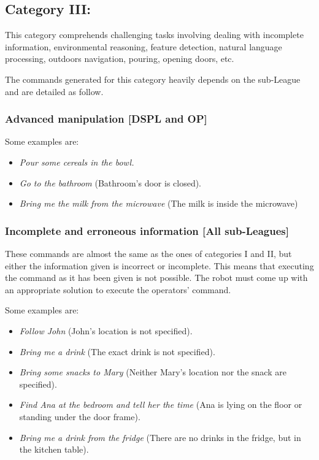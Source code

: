 \subsection{Category III:}
This category comprehends challenging tasks involving dealing with incomplete information, environmental reasoning, feature detection, natural language processing, outdoors navigation, pouring, opening doors, etc.

The commands generated for this category heavily depends on the sub-League and are detailed as follow.

\subsubsection{Advanced manipulation [DSPL and OP]}
Some examples are:
\begin{itemize}
	\item \textit{Pour some cereals in the bowl.}
	\item \textit{Go to the bathroom} (Bathroom's door is closed).
	\item \textit{Bring me the milk from the microwave} (The milk is inside the microwave)
\end{itemize}

\subsubsection{Incomplete and erroneous information [All sub-Leagues]}
These commands are almost the same as the ones of categories I and II, but either the information given is incorrect or incomplete. This means that executing the command as it has been given is not possible. The robot must come up with an appropriate solution to execute the operators' command.

Some examples are:
\begin{itemize}
	\item \textit{Follow John} (John's location is not specified).
	\item \textit{Bring me a drink} (The exact drink is not specified).
	\item \textit{Bring some snacks to Mary} (Neither Mary's location nor the snack are specified).
	\item \textit{Find Ana at the bedroom and tell her the time} (Ana is lying on the floor or standing under the door frame).
	\item \textit{Bring me a drink from the fridge} (There are no drinks in the fridge, but in the kitchen table).
\end{itemize}

